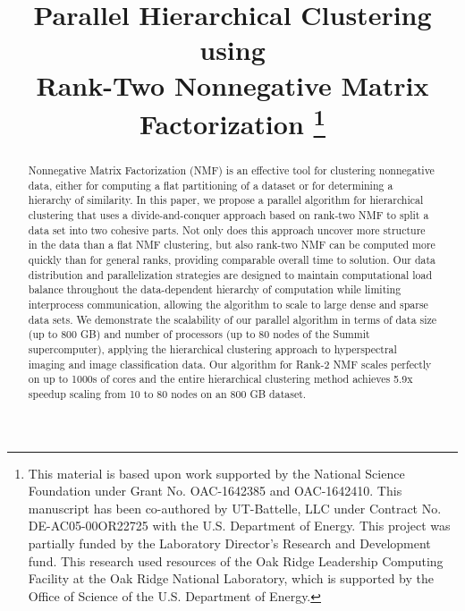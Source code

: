 \documentclass[conference,compsoc]{IEEEtran}
\begin{document}
\title{Parallel Hierarchical Clustering using \\ Rank-Two Nonnegative Matrix Factorization
\thanks{This material is based upon work supported by the National Science Foundation under Grant No. OAC-1642385 and OAC-1642410.
This manuscript has been co-authored by UT-Battelle, LLC under Contract No. DE-AC05-00OR22725 with the U.S. Department of
Energy. This project was partially funded by the Laboratory Director's Research and Development fund. This research used resources
of the Oak Ridge Leadership Computing Facility at the Oak Ridge National Laboratory, which is supported by the Office of Science of
the U.S. Department of Energy.}
}

\author{
\and
{}
\and
{}
}

\maketitle

\begin{abstract}
Nonnegative Matrix Factorization (NMF) is an effective tool for clustering nonnegative data, either for computing a flat partitioning of a dataset or for determining a hierarchy of similarity.
In this paper, we propose a parallel algorithm for hierarchical clustering that uses a divide-and-conquer approach based on rank-two NMF to split a data set into two cohesive parts.
Not only does this approach uncover more structure in the data than a flat NMF clustering, but also rank-two NMF can be computed more quickly than for general ranks, providing comparable overall time to solution.
Our data distribution and parallelization strategies are designed to maintain computational load balance throughout the data-dependent hierarchy of computation while limiting interprocess communication, allowing the algorithm to scale to large dense and sparse data sets.
We demonstrate the scalability of our parallel algorithm in terms of data size (up to 800 GB) and number of processors (up to 80 nodes of the Summit supercomputer), applying the hierarchical clustering approach to hyperspectral imaging and image classification data. 
Our algorithm for Rank-2 NMF scales perfectly on up to 1000s of cores and the entire hierarchical clustering method achieves 5.9x speedup scaling from 10 to 80 nodes on an 800 GB dataset.
\end{abstract}
\end{document}
